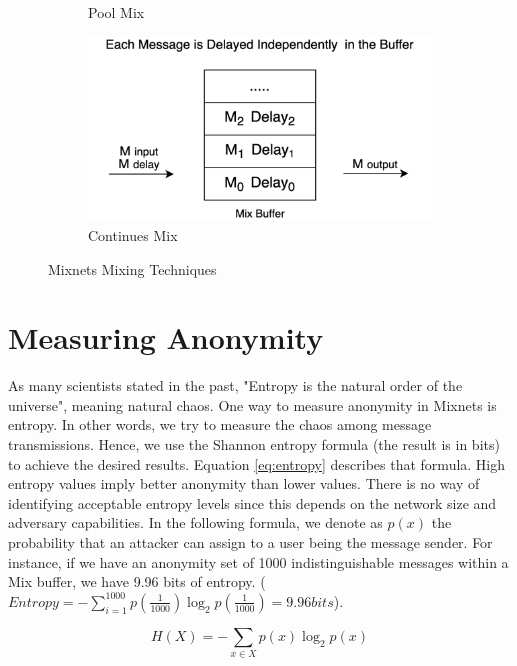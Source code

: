 \documentclass[logo,msc,cyber]{infthesis}   %
\begin{document}
\begin{figure}[h!]
\begin{subfigure}[b]{0.45\textwidth}
        \caption{Pool Mix}
        \label{fig:pool-mix}
    \end{subfigure}
    \hfill
    \begin{subfigure}[b]{0.45\textwidth}
        \centering
        \includegraphics[width=\textwidth]{figures/mixing_techniques/continues.png}
        \caption{Continues Mix}
        \label{fig:continues-mix}
    \end{subfigure}
       \caption{Mixnets Mixing Techniques}
       \label{fig:mixnets-mixing-techniques}
 \end{figure}

\section{Measuring Anonymity}

As many scientists stated in the past, "Entropy is the natural order of the
universe", meaning natural chaos. One way to measure anonymity in Mixnets is
entropy. In other words, we try to measure the chaos among message
transmissions. Hence, we use the Shannon entropy formula (the result is in bits)
to achieve the desired results. Equation \ref{eq:entropy} describes that
formula. High entropy values imply better anonymity than lower values. There is
no way of identifying acceptable entropy levels since this depends on the
network size and adversary capabilities. In the following formula, we denote as
$p(x)$ the probability that an attacker can assign to a user being the message
sender. For instance, if we have an anonymity set of 1000 indistinguishable
messages within a Mix buffer, we have 9.96 bits of entropy. ($Entropy = -\sum_{i
= 1}^{1000}p(\frac{1}{1000}) \log_2p(\frac{1}{1000}) = 9.96 bits$). 

\begin{equation}
    \label{eq:entropy}
    H(X) = -\sum_{x \in X} p(x) \log_2p(x)     
\end{equation}
\end{document}
